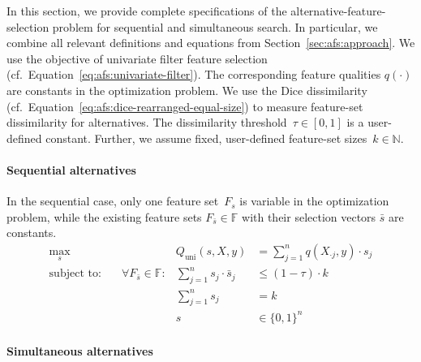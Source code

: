 \documentclass{article}
\theoremstyle{definition}
\begin{document}
In this section, we provide complete specifications of the alternative-feature-selection problem for sequential and simultaneous search.
In particular, we combine all relevant definitions and equations from Section~\ref{sec:afs:approach}.
We use the objective of univariate filter feature selection (cf.~Equation~\ref{eq:afs:univariate-filter}).
The corresponding feature qualities $q(\cdot)$ are constants in the optimization problem.
We use the Dice dissimilarity (cf.~Equation~\ref{eq:afs:dice-rearranged-equal-size}) to measure feature-set dissimilarity for alternatives.
The dissimilarity threshold~$\tau \in [0,1]$ is a user-defined constant.
Further, we assume fixed, user-defined feature-set sizes~$k \in \mathbb{N}$.

\paragraph{Sequential alternatives}

In the sequential case, only one feature set~$F_s$ is variable in the optimization problem, while the existing feature sets $F_{\bar{s}} \in \mathbb{F}$ with their selection vectors $\bar{s}$ are constants.
%
\begin{equation}
	\begin{aligned}
		\max_s &\quad & Q_{\text{uni}}(s,X,y) &= \sum_{j=1}^{n} q(X_{\cdot{}j},y) \cdot s_j \\
		\text{subject to:} &\quad \forall F_{\bar{s}} \in \mathbb{F}: & \sum_{j=1}^n s_j \cdot \bar{s}_j &\leq (1 - \tau) \cdot k \\
		&\quad & \sum_{j=1}^n s_j &= k \\
		&\quad & s &\in \{0,1\}^n
	\end{aligned}
	\label{eq:afs:afs-sequential-complete}
\end{equation}
%
\paragraph{Simultaneous alternatives}
\end{document}
